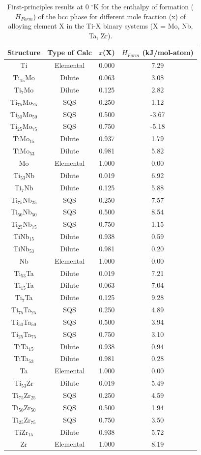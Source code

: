 \newpage
\begin{table}[H]
	\caption{First-principles results at 0 $^{\circ}$K for the enthalpy of formation ($H_{Form}$) of the bcc phase for different mole fraction (x) of alloying element X in the Ti-X binary systems (X = Mo, Nb, Ta, Zr).}
	\centering
	\begin{tabular}{ c c c c }
		\hline
		Structure & Type of Calc & $x$(X) & $H_{Form}$ (kJ/mol-atom)\\
		\hline
		Ti & Elemental & 0.000 & 7.29\\
		Ti$_{15}$Mo & Dilute & 0.063 & 3.08\\
		Ti$_{7}$Mo & Dilute & 0.125 & 2.82\\
		Ti$_{75}$Mo$_{25}$ & SQS & 0.250 & 1.12\\
		Ti$_{50}$Mo$_{50}$ & SQS & 0.500 & -3.67\\
		Ti$_{25}$Mo$_{75}$ & SQS & 0.750 & -5.18\\
		TiMo$_{15}$ & Dilute & 0.937 & 1.79\\
		TiMo$_{53}$ & Dilute & 0.981 & 5.82\\
		Mo & Elemental & 1.000 & 0.00\\
		Ti$_{53}$Nb & Dilute & 0.019 & 6.92\\
		Ti$_{7}$Nb & Dilute & 0.125 & 5.88\\ 
		Ti$_{75}$Nb$_{25}$ & SQS & 0.250 & 7.57\\
		Ti$_{50}$Nb$_{50}$ & SQS & 0.500 & 8.54\\
		Ti$_{25}$Nb$_{75}$ & SQS & 0.750 & 1.15\\
		TiNb$_{15}$ & Dilute & 0.938 & 0.59\\
		TiNb$_{53}$ & Dilute & 0.981 & 0.20\\
		Nb & Elemental & 1.000 & 0.00\\
		Ti$_{53}$Ta & Dilute & 0.019 & 7.21\\
		Ti$_{15}$Ta & Dilute & 0.063 & 7.04\\
		Ti$_{7}$Ta & Dilute & 0.125 & 9.28\\
		Ti$_{75}$Ta$_{25}$ & SQS & 0.250 & 4.89\\
		Ti$_{50}$Ta$_{50}$ & SQS & 0.500 & 3.94\\
		Ti$_{25}$Ta$_{75}$ & SQS & 0.750 & 3.10\\
		TiTa$_{15}$ & Dilute & 0.938 & 0.94\\
		TiTa$_{53}$ & Dilute & 0.981 & 0.28\\
		Ta & Elemental & 1.000 & 0.00\\
		Ti$_{53}$Zr & Dilute & 0.019 & 5.49\\
		Ti$_{75}$Zr$_{25}$ & SQS & 0.250 & 4.59\\
		Ti$_{50}$Zr$_{50}$ & SQS & 0.500 & 1.94\\
		Ti$_{25}$Zr$_{75}$ & SQS & 0.750 & 3.50\\
		TiZr$_{15}$ & Dilute & 0.938 & 5.72\\
		Zr & Elemental & 1.000 & 8.19\\
		\hline
	\end{tabular}
    \label{Ch3-table:binaryhform}
\end{table}
\clearpage

